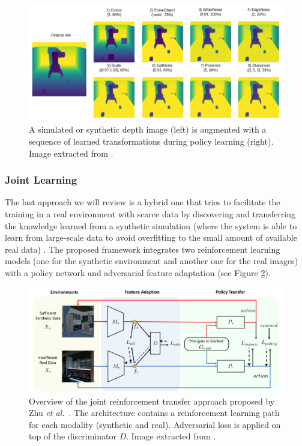\begin{figure}[!htb]
    \centering
    \includegraphics[width=\linewidth]{Figures/Sim2Real/aug.png}
    \caption{A simulated or synthetic depth image (left) is augmented with a sequence of learned transformations during policy learning (right). Image extracted from \cite{Pashevich2019}.}
    \label{fig:sim2real:aug}
\end{figure}


\subsubsection{Joint Learning}

The last approach we will review is a hybrid one that tries to facilitate the training in a real environment with scarce data by discovering and transferring the knowledge learned from a synthetic simulation (where the system is able to learn from large-scale data to avoid overfitting to the small amount of available real data) \cite{Zhu2019}. The proposed framework integrates two reinforcement learning models (one for the synthetic environment and another one for the real images) with a policy network and adversarial feature adaptation (see Figure \ref{fig:sim2real:joint}).

\begin{figure}[!htb]
    \centering
    \includegraphics[width=\linewidth]{Figures/Sim2Real/jointlearning.png}
    \caption{Overview of the joint reinforcement transfer approach proposed by Zhu \emph{et al.}~\cite{Zhu2019}. The architecture contains a reinforcement learning path for each modality (synthetic and real). Adversarial loss is applied on top of the discriminator $D$. Image extracted from \cite{Zhu2019}.}
    \label{fig:sim2real:joint}
\end{figure}


